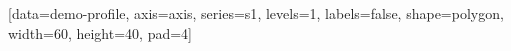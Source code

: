 \documentclass{article}
\begin{document}
\ExplSyntaxOn
\SemioVizProbeOn
\SemioVizChartsDryRun
{}
[data=demo-profile, axis=axis, series={s1}, levels=1, labels=false, shape=polygon, width=60, height=40, pad=4]
\ExplSyntaxOff
\end{document}
